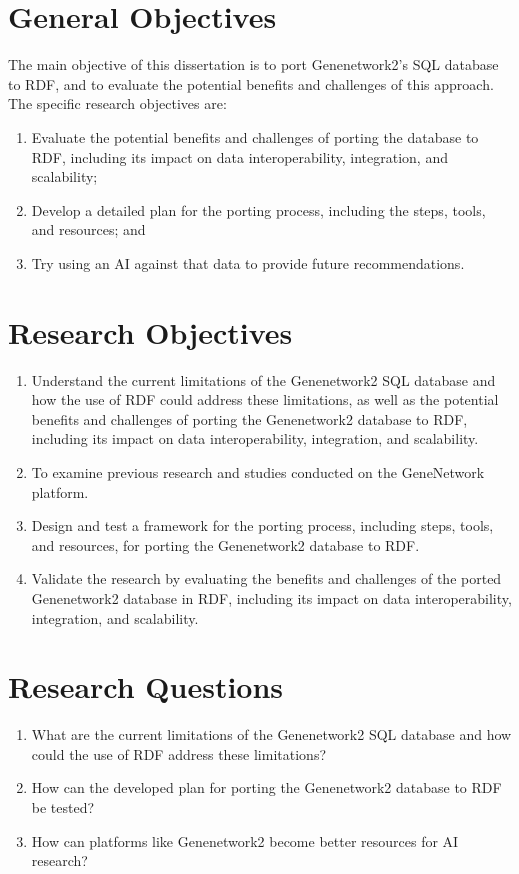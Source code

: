 \section{General Objectives}

The main objective of this dissertation is to port Genenetwork2's SQL database to RDF, and to evaluate the potential benefits and challenges of this approach.  The specific research objectives are:

\begin{enumerate}
\item Evaluate the potential benefits and challenges of porting the database to RDF, including its impact on data interoperability, integration, and scalability;
\item Develop a detailed plan for the porting process, including the steps, tools, and resources; and
\item Try using an AI against that data to provide future recommendations.
\end{enumerate}


\section{Research Objectives}

\begin{enumerate}
\item Understand the current limitations of the Genenetwork2 SQL database and how the use of RDF could address these limitations, as well as the potential benefits and challenges of porting the Genenetwork2 database to RDF, including its impact on data interoperability, integration, and scalability.
  \item To examine previous research and studies conducted on the GeneNetwork platform.
\item Design and test a framework for the porting process, including steps, tools, and resources, for porting the Genenetwork2 database to RDF.
\item Validate the research by evaluating the benefits and challenges of the ported Genenetwork2 database in RDF, including its impact on data interoperability, integration, and scalability.
\end{enumerate}

\section{Research Questions}

\begin{enumerate}
\item What are the current limitations of the Genenetwork2 SQL database and how could the use of RDF address these limitations?
\item How can the developed plan for porting the Genenetwork2 database to RDF be tested?
\item How can platforms like Genenetwork2 become better resources for AI research?
\end{enumerate}


